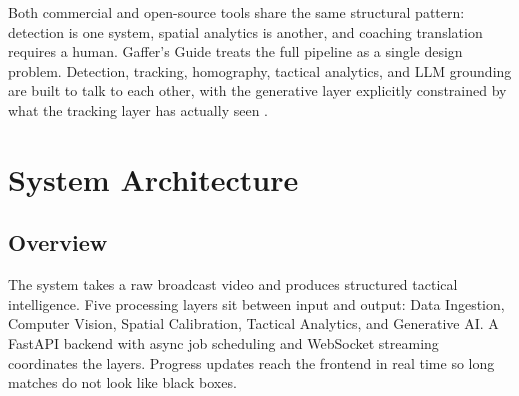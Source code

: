 \documentclass[conference]{IEEEtran}
\begin{document}
Both commercial and open-source tools share the same structural pattern: detection is one system, spatial analytics is another, and coaching translation requires a human. Gaffer's Guide treats the full pipeline as a single design problem. Detection, tracking, homography, tactical analytics, and LLM grounding are built to talk to each other, with the generative layer explicitly constrained by what the tracking layer has actually seen \cite{pappalardo2019}.

\section{System Architecture}
\label{sec:architecture}

\subsection{Overview}

The system takes a raw broadcast video and produces structured tactical intelligence. Five processing layers sit between input and output: Data Ingestion, Computer Vision, Spatial Calibration, Tactical Analytics, and Generative AI. A FastAPI backend with async job scheduling and WebSocket streaming coordinates the layers. Progress updates reach the frontend in real time so long matches do not look like black boxes.
\end{document}
